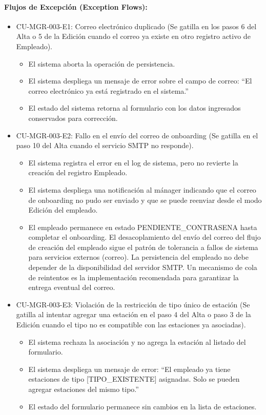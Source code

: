 \paragraph{Flujos de Excepción (Exception Flows):}
\begin{itemize}
    \item CU-MGR-003-E1: Correo electrónico duplicado (Se gatilla en los pasos 6 del Alta o 5 de la Edición cuando el correo ya existe en otro registro activo de Empleado).
    \begin{itemize}
        \item El sistema aborta la operación de persistencia.
        \item El sistema despliega un mensaje de error sobre el campo de correo: ``El correo electrónico ya está registrado en el sistema.''
        \item El estado del sistema retorna al formulario con los datos ingresados conservados para corrección.
    \end{itemize}
    \item CU-MGR-003-E2: Fallo en el envío del correo de onboarding (Se gatilla en el paso 10 del Alta cuando el servicio SMTP no responde).
    \begin{itemize}
        \item El sistema registra el error en el log de sistema, pero no revierte la creación del registro Empleado.
        \item El sistema despliega una notificación al mánager indicando que el correo de onboarding no pudo ser enviado y que se puede reenviar desde el modo Edición del empleado.
        \item El empleado permanece en estado PENDIENTE\_CONTRASENA hasta completar el onboarding. El desacoplamiento del envío del correo del flujo de creación del empleado sigue el patrón de tolerancia a fallos de sistema para servicios externos (correo). La persistencia del empleado no debe depender de la disponibilidad del servidor SMTP. Un mecanismo de cola de reintentos es la implementación recomendada para garantizar la entrega eventual del correo.
    \end{itemize}
    \item CU-MGR-003-E3: Violación de la restricción de tipo único de estación (Se gatilla al intentar agregar una estación en el paso 4 del Alta o paso 3 de la Edición cuando el tipo no es compatible con las estaciones ya asociadas).
    \begin{itemize}
        \item El sistema rechaza la asociación y no agrega la estación al listado del formulario.
        \item El sistema despliega un mensaje de error: ``El empleado ya tiene estaciones de tipo [TIPO\_EXISTENTE] asignadas. Solo se pueden agregar estaciones del mismo tipo.''
        \item El estado del formulario permanece sin cambios en la lista de estaciones.
    \end{itemize}
\end{itemize}

